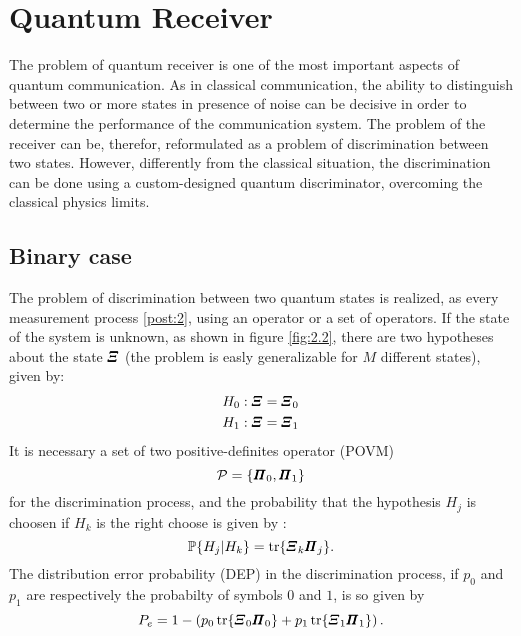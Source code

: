 \section{Quantum Receiver}
    The problem of quantum receiver is one of the most important
    aspects of quantum communication. As in classical communication, the ability to 
    distinguish between two or more states in presence of noise can be decisive in order to determine
    the performance of the communication system. The problem of the receiver can be, therefor, reformulated
    as a problem of discrimination between two states.
    However, differently from the classical situation,
    the discrimination can be done using a custom-designed quantum discriminator, overcoming
    the classical physics limits.

    \subsection{Binary case}
    The problem of discrimination between two quantum states is realized, as every measurement
    process \ref{post:2}, using an operator or a set of operators.
    If the state of the system is unknown, as shown in figure \ref{fig:2.2}, there are two hypotheses
    about the state $\Operator{\varXi}$ (the problem is easly generalizable for $M$ different states),
    given by:
    \begin{equation}\begin{split}
        H_0 &: \Operator{\varXi}=\Operator{\varXi}_0\\
        H_1 &: \Operator{\varXi}=\Operator{\varXi}_1
        \label{eq:binHyp}
    \end{split}\end{equation}
    It is necessary a set of two positive-definites operator (POVM)
    \begin{equation}
        \mathcal{P}=\{\Operator{\varPi}_0,\Operator{\varPi}_1\}
    \end{equation}
    for the discrimination process, and the probability that the hypothesis $H_j$ is choosen
    if $H_k$ is the right choose is given by \cite{tesiGuerrini}:
    \begin{equation}
        \mathbb{P}\{H_j|H_k\}=\tr{\Operator{\varXi}_k\Operator{\varPi}_j}.
    \end{equation}
    The distribution error probability (DEP) in the discrimination process, if $p_0$ and $p_1$ are 
    respectively the probabilty of symbols $0$ and $1$, is so given by
    \begin{equation}
        P_e=1-\left(p_0 \tr{\Operator{\varXi}_0\Operator{\varPi}_0}+p_1 \tr{\Operator{\varXi}_1\Operator{\varPi}_1}\right).
    \end{equation}

